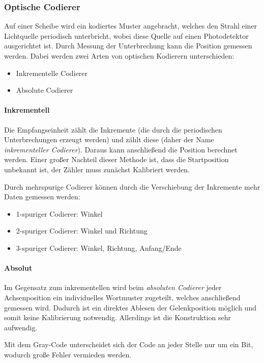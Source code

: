 			\subsubsection{Optische Codierer}
				Auf einer Scheibe wird ein kodiertes Muster angebracht, welches den Strahl einer Lichtquelle periodisch unterbricht, wobei diese Quelle auf einen Photodetektor ausgerichtet ist. Durch Messung der Unterbrechung kann die Position gemessen werden. Dabei werden zwei Arten von optischen Kodierern unterschieden:
				\begin{itemize}
					\item Inkrementelle Codierer
					\item Absolute Codierer
				\end{itemize}

				\paragraph{Inkrementell}
					Die Empfangseinheit zählt die Inkremente (die durch die periodischen Unterbrechungen erzeugt werden) und zählt diese (daher der Name \emph{inkrementeller Codierer}). Daraus kann anschließend die Position berechnet werden. Einer großer Nachteil dieser Methode ist, dass die Startposition unbekannt ist, \dh der Zähler muss zunächst Kalibriert werden.
					
					Durch mehrspurige Codierer können durch die Verschiebung der Inkremente mehr Daten gemessen werden:
					\begin{itemize}
						\item 1-spuriger Codierer: Winkel
						\item 2-spuriger Codierer: Winkel und Richtung
						\item 3-spuriger Codierer: Winkel, Richtung, Anfang/Ende
					\end{itemize}

				\paragraph{Absolut}
					Im Gegensatz zum inkrementellen wird beim \emph{absoluten Codierer} jeder Achsenposition ein individuelles Wortmuster zugeteilt, welches anschließend gemessen wird. Dadurch ist ein direktes Ablesen der Gelenkposition möglich und somit keine Kalibrierung notwendig. Allerdings ist die Konstruktion sehr aufwendig.
					
					Mit dem Gray-Code unterscheidet sich der Code an jeder Stelle nur um ein Bit, wodurch große Fehler vermieden werden.

